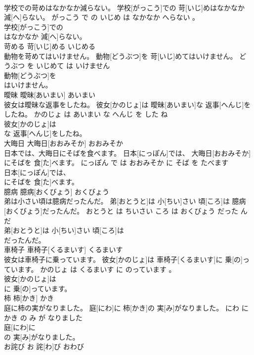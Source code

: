 \documentclass[8pt]{extreport}
\begin{document}
\begin{CJK}{UTF8}{min}
\\	学校での苛めはなかなか減らない。	学校[がっこう]での 苛[いじ]めはなかなか 減[へ]らない。	がっこう で の いじめ は なかなか へらない 。	
\\	学校[がっこう]での
\\	はなかなか 減[へ]らない。			
\\	苛める	苛[いじ]める	いじめる	
\\	動物を苛めてはいけません。	動物[どうぶつ]を 苛[いじ]めてはいけません。	どうぶつ を いじめて は いけません	
\\	動物[どうぶつ]を
\\	はいけません。			
\\	曖昧	曖昧[あいまい]	あいまい	
\\	彼女は曖昧な返事をしたね。	彼女[かのじょ]は 曖昧[あいまい]な 返事[へんじ]をしたね。	かのじょ は あいまい な へんじ を した ね	
\\	彼女[かのじょ]は
\\	な 返事[へんじ]をしたね。			
\\	大晦日	大晦日[おおみそか]	おおみそか	
\\	日本では、大晦日にそばを食べます。	日本[にっぽん]では、 大晦日[おおみそか]にそばを 食[た]べます。	にっぽん で は おおみそか に そば を たべます	
\\	日本[にっぽん]では、
\\	にそばを 食[た]べます。			
\\	臆病	臆病[おくびょう]	おくびょう	
\\	弟は小さい頃は臆病だったんだ。	弟[おとうと]は 小[ちい]さい 頃[ころ]は 臆病[おくびょう]だったんだ。	おとうと は ちいさい ころ は おくびょう だった ん だ	
\\	弟[おとうと]は 小[ちい]さい 頃[ころ]は
\\	だったんだ。			
\\	車椅子	車椅子[くるまいす]	くるまいす	
\\	彼女は車椅子に乗っています。	彼女[かのじょ]は 車椅子[くるまいす]に 乗[の]っています。	かのじょ は くるまいす に のっています 。	
\\	彼女[かのじょ]は
\\	に 乗[の]っています。			
\\	柿	柿[かき]	かき	
\\	庭に柿の実がなりました。	庭[にわ]に 柿[かき]の 実[み]がなりました。	にわ に かき の み が なりました	
\\	庭[にわ]に
\\	の 実[み]がなりました。			
\\	お詫び	お 詫[わ]び	おわび	

\end{CJK}
\end{document}
